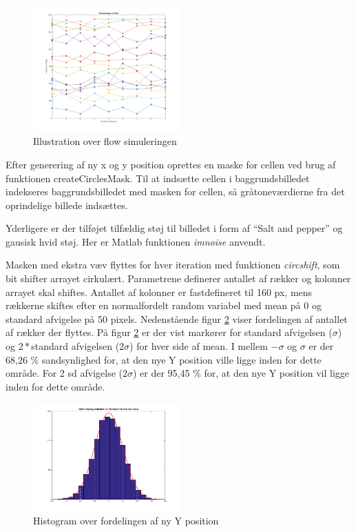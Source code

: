 \begin{figure}[H]
	\centering
	\includegraphics[width=0.5\textwidth]{billeder/software/Simulation.png}
	\caption{Illustration over flow simuleringen}
	\label{fig:flowsim}
\end{figure}

Efter generering af ny x og y position oprettes en maske for cellen ved brug af funktionen createCirclesMask. Til at indsætte cellen i baggrundsbilledet indekseres baggrundsbilledet med masken for cellen, så gråtoneværdierne fra det oprindelige billede indsættes.

Yderligere er der tilføjet tilfældig støj til billedet i form af “Salt and pepper” og gausisk hvid støj. Her er Matlab funktionen \textit{imnoise} anvendt. 

Masken med ekstra væv flyttes for hver iteration med funktionen \textit{circshift}, som bit shifter arrayet cirkulært. Parametrene definerer antallet af rækker og kolonner arrayet skal shiftes.  Antallet af kolonner er fastdefineret til 160 px, mens rækkerne skiftes efter en normalfordelt random variabel med mean på 0 og standard afvigelse på 50 pixels. Nedenstående figur \ref{fig:histfit} viser fordelingen af antallet af rækker der flyttes. På figur \ref{fig:histfit} er der vist markører for standard afvigelsen ($\sigma$) og $2*$standard afvigelsen ($2\sigma$) for hver side af mean. I mellem $-\sigma$ og $\sigma$ er der 68,26 \% sandsynlighed for, at den nye Y position ville ligge inden for dette område. For 2 sd afvigelse ($2\sigma$) er der 95,45 \% for, at den nye Y position vil ligge inden for dette område.

\begin{figure}[H]
	\centering
	\includegraphics[width=0.5\textwidth]{billeder/software/histfit.png}
	\caption{Histogram over fordelingen af ny Y position}
	\label{fig:histfit}
\end{figure}

